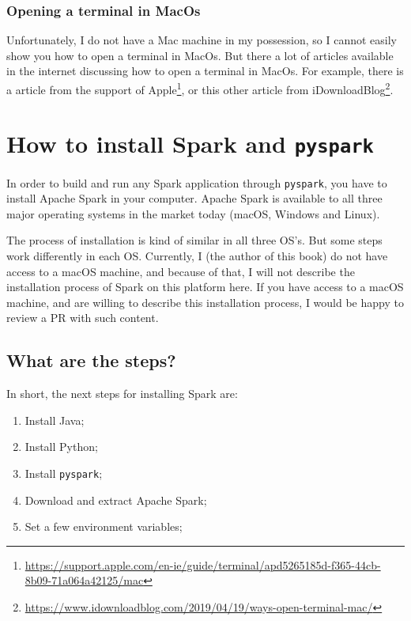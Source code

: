\documentclass[
  11pt,
  letterpaper,
  DIV=11,
  numbers=noendperiod]{scrreprt}
\providecommand{\tightlist}{%
  \setlength{\itemsep}{0pt}\setlength{\parskip}{0pt}}\usepackage{longtable,booktabs,array}
\begin{document}
\hypertarget{opening-a-terminal-in-macos}{%
\subsection{Opening a terminal in
MacOs}\label{opening-a-terminal-in-macos}}

Unfortunately, I do not have a Mac machine in my possession, so I cannot
easily show you how to open a terminal in MacOs. But there a lot of
articles available in the internet discussing how to open a terminal in
MacOs. For example, there is a article from the support of
Apple\footnote{\url{https://support.apple.com/en-ie/guide/terminal/apd5265185d-f365-44cb-8b09-71a064a42125/mac}},
or this other article from iDownloadBlog\footnote{\url{https://www.idownloadblog.com/2019/04/19/ways-open-terminal-mac/}}.

\hypertarget{sec-install-spark}{%
\chapter{\texorpdfstring{How to install Spark and
\texttt{pyspark}}{How to install Spark and pyspark}}\label{sec-install-spark}}

In order to build and run any Spark application through
\texttt{pyspark}, you have to install Apache Spark in your computer.
Apache Spark is available to all three major operating systems in the
market today (macOS, Windows and Linux).

The process of installation is kind of similar in all three OS's. But
some steps work differently in each OS. Currently, I (the author of this
book) do not have access to a macOS machine, and because of that, I will
not describe the installation process of Spark on this platform here. If
you have access to a macOS machine, and are willing to describe this
installation process, I would be happy to review a PR with such content.

\hypertarget{what-are-the-steps}{%
\section{What are the steps?}\label{what-are-the-steps}}

In short, the next steps for installing Spark are:

\begin{enumerate}
\def\labelenumi{\arabic{enumi}.}
\tightlist
\item
  Install Java;
\item
  Install Python;
\item
  Install \texttt{pyspark};
\item
  Download and extract Apache Spark;
\item
  Set a few environment variables;
\end{enumerate}
\end{document}
